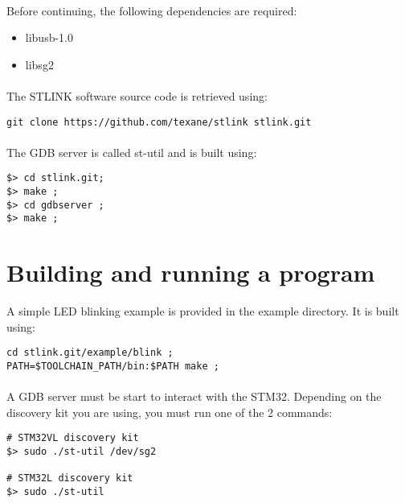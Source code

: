 \documentclass[a4paper, 11pt]{article}
\begin{document}
\paragraph{}
Before continuing, the following dependencies are required:
\begin{itemize}
\item libusb-1.0
\item libsg2
\end{itemize}

\paragraph{}
The STLINK software source code is retrieved using:\\
\begin{small}
\begin{lstlisting}[frame=tb]
git clone https://github.com/texane/stlink stlink.git
\end{lstlisting}
\end{small}

\paragraph{}
The GDB server is called st-util and is built using:\\
\begin{small}
\begin{lstlisting}[frame=tb]
$> cd stlink.git;
$> make ;
$> cd gdbserver ;
$> make ;
\end{lstlisting}
\end{small}


\newpage

\section{Building and running a program}
A simple LED blinking example is provided in the example directory. It is built using:\\
\begin{small}
\begin{lstlisting}[frame=tb]
cd stlink.git/example/blink ;
PATH=$TOOLCHAIN_PATH/bin:$PATH make ;
\end{lstlisting}
\end{small}

\paragraph{}
A GDB server must be start to interact with the STM32. Depending on the discovery kit you
are using, you must run one of the 2 commands:\\
\begin{small}
\begin{lstlisting}[frame=tb]
# STM32VL discovery kit
$> sudo ./st-util /dev/sg2

# STM32L discovery kit
$> sudo ./st-util
\end{lstlisting}
\end{small}
\end{document}
